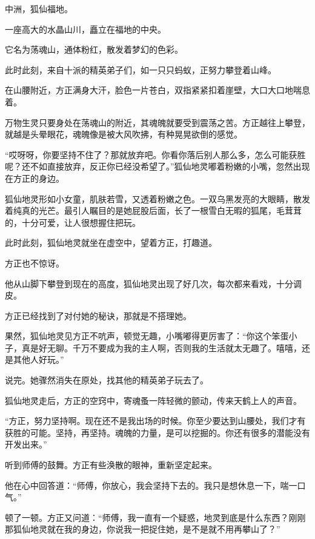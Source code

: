 
\begin{this_body}

中洲，狐仙福地。

一座高大的水晶山川，矗立在福地的中央。

它名为荡魂山，通体粉红，散发着梦幻的色彩。

此时此刻，来自十派的精英弟子们，如一只只蚂蚁，正努力攀登着山峰。

在山腰附近，方正满身大汗，脸色一片苍白，双指紧紧扣着崖壁，大口大口地喘息着。

万物生灵只要身处在荡魂山的附近，其魂魄就要受到震荡之苦。方正越往上攀登，就越是头晕眼花，魂魄像是被大风吹拂，有种晃晃欲倒的感觉。

“哎呀呀，你要坚持不住了？那就放弃吧。你看你落后别人那么多，怎么可能获胜呢？还不如直接放弃，反正你已经没希望了。”狐仙地灵嘟着粉嫩的小嘴，忽然出现在方正的身边。

狐仙地灵形如小女童，肌肤若雪，又透着粉嫩之色。一双乌黑发亮的大眼睛，散发着纯真的光芒。最引人瞩目的是她屁股后面，长了一根雪白无暇的狐尾，毛茸茸的，十分可爱，让人很想握住把玩。

此时此刻，狐仙地灵就坐在虚空中，望着方正，打趣道。

方正也不惊讶。

他从山脚下攀登到现在的高度，狐仙地灵出现了好几次，每次都来看戏，十分调皮。

方正已经找到了对付她的秘诀，那就是不搭理她。

果然，狐仙地灵见方正不吭声，顿觉无趣，小嘴嘟得更厉害了：“你这个笨蛋小子，真是好无聊。千万不要成为我的主人啊，否则我的生活就太无趣了。嘻嘻，还是其他人好玩。”

说完。她骤然消失在原处，找其他的精英弟子玩去了。

狐仙地灵走后，方正的空窍中，寄魂蚤一阵轻微的颤动，传来天鹤上人的声音。

“方正，努力坚持啊。现在还不是我出场的时候。你至少要达到山腰处，我们才有获胜的可能。坚持，再坚持。魂魄的力量，是可以挖掘的。你还有很多的潜能没有开发出来。”

听到师傅的鼓舞。方正有些涣散的眼神，重新坚定起来。

他在心中回答道：“师傅，你放心，我会坚持下去的。我只是想休息一下，喘一口气。”

顿了一顿。方正又问道：“师傅，我一直有一个疑惑，地灵到底是什么东西？刚刚那狐仙地灵就在我的身边，你说我一把捉住她，是不是就不用再攀山了？”


\end{this_body}
